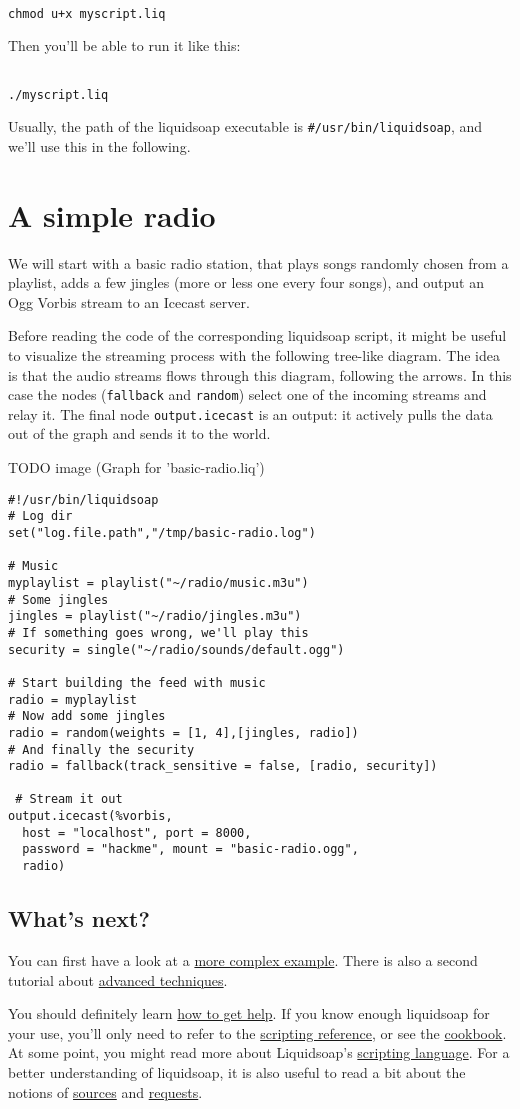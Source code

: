 \documentclass{book}
\begin{document}
\begin{verbatim}

chmod u+x myscript.liq
\end{verbatim}
Then you'll be able to run it like this:

\begin{verbatim}

./myscript.liq
\end{verbatim}
Usually, the path of the liquidsoap executable is \verb+#/usr/bin/liquidsoap+,
and we'll use this in the following.

\section{A simple radio}
We will start with a basic radio station, that plays songs randomly chosen from
a playlist, adds a few jingles (more or less one every four songs), and output
an Ogg Vorbis stream to an Icecast server.

Before reading the code of the corresponding liquidsoap script, it might be
useful to visualize the streaming process with the following tree-like
diagram. The idea is that the audio streams flows through this diagram,
following the arrows. In this case the nodes (\verb+fallback+ and \verb+random+)
select one of the incoming streams and relay it. The final node
\verb+output.icecast+ is an output: it actively pulls the data out of the graph
and sends it to the world.

TODO image (Graph for 'basic-radio.liq')

\begin{verbatim}
#!/usr/bin/liquidsoap
# Log dir
set("log.file.path","/tmp/basic-radio.log")

# Music
myplaylist = playlist("~/radio/music.m3u")
# Some jingles
jingles = playlist("~/radio/jingles.m3u")
# If something goes wrong, we'll play this
security = single("~/radio/sounds/default.ogg")

# Start building the feed with music
radio = myplaylist
# Now add some jingles
radio = random(weights = [1, 4],[jingles, radio])
# And finally the security
radio = fallback(track_sensitive = false, [radio, security])

 # Stream it out
output.icecast(%vorbis,
  host = "localhost", port = 8000,
  password = "hackme", mount = "basic-radio.ogg",
  radio)
\end{verbatim}

\subsection{What's next?}
You can first have a look at a \href{complete_case.html}{more complex
  example}. There is also a second tutorial about \href{advanced.html}{advanced
  techniques}.

You should definitely learn \href{help.html}{how to get help}.  If you know
enough liquidsoap for your use, you'll only need to refer to the
\href{reference.html}{scripting reference}, or see the
\href{cookbook.html}{cookbook}.  At some point, you might read more about
Liquidsoap's \href{language.html}{scripting language}.  For a better
understanding of liquidsoap, it is also useful to read a bit about the notions
of \href{sources.html}{sources} and \href{requests.html}{requests}.
\end{document}
